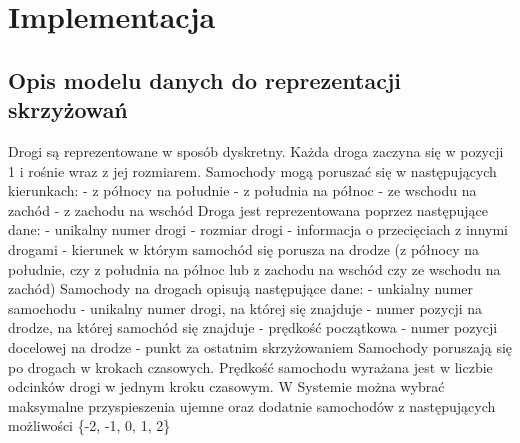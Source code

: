\chapter{Implementacja} \label{chap:implementation}

\section{Opis modelu danych do reprezentacji skrzyżowań}

Drogi są reprezentowane w sposób dyskretny. Każda droga zaczyna się w pozycji 1 i rośnie wraz z jej rozmiarem. 
\newline
Samochody mogą poruszać się w następujących kierunkach:
\newline
- z północy na południe
\newline
- z południa na północ
\newline
- ze wschodu na zachód
\newline
- z zachodu na wschód
\newline
\newline
Droga jest reprezentowana poprzez następujące dane:
\newline
- unikalny numer drogi
\newline
- rozmiar drogi
\newline
- informacja o przecięciach z innymi drogami
\newline
- kierunek w którym samochód się porusza na drodze (z północy na południe, czy z południa na północ lub z zachodu na wschód czy ze wschodu na zachód)
\newline
\newline
Samochody na drogach opisują następujące dane:
\newline
- unkialny numer samochodu
\newline
- unikalny numer drogi, na której się znajduje
\newline
- numer pozycji na drodze, na której samochód się znajduje
\newline
- prędkość początkowa
\newline
- numer pozycji docelowej na drodze - punkt za ostatnim skrzyżowaniem
\newline
\newline
Samochody poruszają się po drogach w krokach czasowych. Prędkość samochodu wyrażana jest w liczbie odcinków drogi w jednym kroku czasowym.
\newline
W Systemie można wybrać maksymalne przyspieszenia ujemne oraz dodatnie samochodów z następujących możliwości \{-2, -1, 0, 1, 2\}

